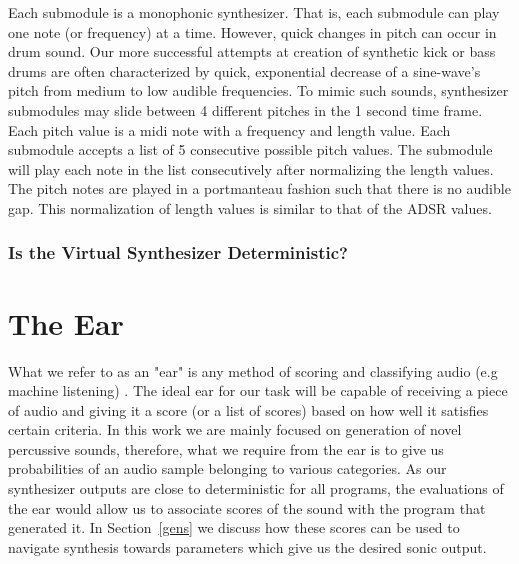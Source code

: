 \documentclass[\main/thesis.tex]{subfiles}
\begin{document}
Each submodule is a monophonic synthesizer. That is, each submodule can play one note (or frequency) at a time. However, quick changes in pitch can occur in drum sound. Our more successful attempts at creation of synthetic kick or bass drums are often characterized by quick, exponential decrease of a sine-wave's pitch from medium to low audible frequencies. To mimic such sounds, synthesizer submodules may slide between 4 different pitches in the 1 second time frame. Each pitch value is a midi note with a frequency and length value. Each submodule accepts a list of 5 consecutive possible pitch values. The submodule will play each note in the list consecutively after normalizing the length values. The pitch notes are played in a portmanteau fashion such that there is no audible gap. This normalization of length values is similar to that of the ADSR values. 



\subsubsection{Is the Virtual Synthesizer Deterministic?}
\label{chap3:synth_deterministic}
\section{The Ear}

What we refer to as an "ear" is any method of scoring and classifying audio (e.g machine listening) \cite{malkin2006machine,rowe1992interactive}. The ideal ear for our task will be capable of receiving a piece of audio and giving it a score (or a list of scores) based on how well it satisfies certain criteria. In this work we are mainly focused on generation of novel percussive sounds, therefore, what we require from the ear is to give us probabilities of an audio sample belonging to various categories. As our synthesizer outputs are close to deterministic for all programs, the evaluations of the ear would allow us to associate scores of the sound with the program that generated it. In Section~\ref{gens} we discuss how these scores can be used to navigate synthesis towards parameters which give us the desired sonic output.
\end{document}
